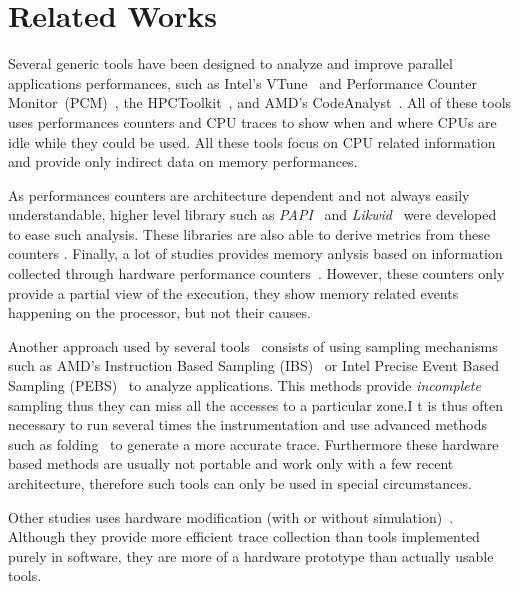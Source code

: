 
\section{Related Works}
\label{sec:related}

Several generic tools have been designed to analyze and improve parallel
applications performances, such as Intel's VTune~\cite{Reinders05VTune} and
Performance Counter Monitor~(PCM)~\cite{Intel2012b}, the
HPCToolkit~\cite{Adhianto10HPCTOOLKIT}, and AMD's
CodeAnalyst~\cite{Drongowski2008}. All of these tools uses performances
counters and CPU traces to show when and where CPUs are idle while they could
be used. All these tools focus on CPU related information and provide only
indirect data on memory performances.

As performances counters are architecture dependent and not always easily
understandable, higher level library such as \emph{PAPI}~\cite{Weaver13PAPI} and
\emph{Likwid}~\cite{Treibig10LIKWID} were developed to ease such analysis. These
libraries are also able to derive metrics from these counters . Finally, a lot of studies provides memory anlysis based
on information collected through hardware performance counters~\cite{Majo13(Mis)understanding,
Jiang14Understanding,Bosch00Rivet,Weyers14Visualization,Tao01Visualizing,DeRose01Hardware}.
However, these counters only provide a partial view of the execution, they
show memory related events happening on the processor, but not their causes.

Another approach used by several
tools~\cite{Lachaize12MemProf,McCurdy10Memphis,Liu14Tool,Gimenez14Dissecting}
consists of using sampling mechanisms such as AMD's Instruction Based Sampling
(IBS)~\cite{Drongowski07Instructionbased} or Intel Precise Event Based
Sampling (PEBS)~\cite{Levinthal2009} to analyze applications. This methods
provide \emph{incomplete} sampling thus they can miss all the accesses to a
particular zone.I t is thus often necessary to run several times the
instrumentation and use advanced methods such as
folding~\cite{Servat15Towards} to generate a more accurate trace. Furthermore
these hardware based methods are usually not portable and work only with a few
recent architecture, therefore such tools can only be used in special
circumstances.

Other studies uses hardware modification (with or without
simulation)~\cite{Bao08HMTT,Martonosi92MemSpy}.  Although they provide more
efficient trace collection than tools implemented purely in software, they are
more of a hardware prototype than actually usable tools.

